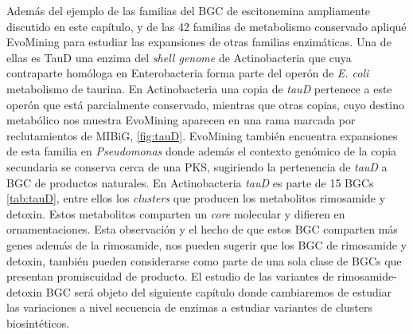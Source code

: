\documentclass[12pt,twoside]{reedthesis}
\begin{document}
  Además del ejemplo de las familias del BGC de escitonemina ampliamente
  discutido en este capítulo, y de las 42 familias de metabolismo
  conservado apliqué EvoMining para estudiar las expansiones de otras
  familias enzimáticas. Una de ellas es TauD una enzima del \emph{shell
  genome} de Actinobacteria que cuya contraparte homóloga en
  Enterobacteria forma parte del operón de \emph{E. coli} metabolismo de
  taurina. En Actinobacteria una copia de \emph{tauD} pertenece a este
  operón que está parcialmente conservado, mientras que otras copias, cuyo
  destino metabólico nos muestra EvoMining aparecen en una rama marcada
  por reclutamientos de MIBiG, \autoref{fig:tauD}. EvoMining también
  encuentra expansiones de esta familia en \emph{Pseudomonas} donde además
  el contexto genómico de la copia secundaria se conserva cerca de una
  PKS, sugiriendo la pertenencia de \emph{tauD} a BGC de productos
  naturales. En Actinobacteria \emph{tauD} es parte de 15 BGCs
  \autoref{tab:tauD}, entre ellos los \emph{clusters} que producen los
  metabolitos rimosamide y detoxin. Estos metabolitos comparten un
  \emph{core} molecular y difieren en ornamentaciones. Esta observación y
  el hecho de que estos BGC comparten más genes además de la rimosamide,
  nos pueden sugerir que los BGC de rimosamide y detoxin, también pueden
  considerarse como parte de una sola clase de BGCs que presentan
  promiscuidad de producto. El estudio de las variantes de
  rimosamide-detoxin BGC será objeto del siguiente capítulo donde
  cambiaremos de estudiar las variaciones a nivel secuencia de enzimas a
  estudiar variantes de clusters biosintéticos.
  
\end{document}
